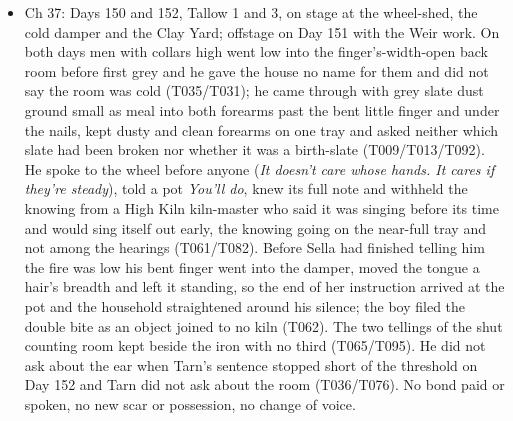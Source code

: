 \documentclass{design/chronicle}
\begin{document}
{\begin{itemize}[leftmargin=1.4em,itemsep=1pt,topsep=3pt,parsep=0pt]
\item Ch 37: Days 150 and 152, Tallow 1 and 3, on stage at the wheel-shed, the cold damper and the Clay Yard; offstage on Day 151 with the Weir work. On both days men with collars high went low into the finger’s-width-open back room before first grey and he gave the house no name for them and did not say the room was cold (T035/T031); he came through with grey slate dust ground small as meal into both forearms past the bent little finger and under the nails, kept dusty and clean forearms on one tray and asked neither which slate had been broken nor whether it was a birth-slate (T009/T013/T092). He spoke to the wheel before anyone (\emph{It doesn’t care whose hands. It cares if they’re steady}), told a pot \emph{You’ll do}, knew its full note and withheld the knowing from a High Kiln kiln-master who said it was singing before its time and would sing itself out early, the knowing going on the near-full tray and not among the hearings (T061/T082). Before Sella had finished telling him the fire was low his bent finger went into the damper, moved the tongue a hair’s breadth and left it standing, so the end of her instruction arrived at the pot and the household straightened around his silence; the boy filed the double bite as an object joined to no kiln (T062). The two tellings of the shut counting room kept beside the iron with no third (T065/T095). He did not ask about the ear when Tarn’s sentence stopped short of the threshold on Day 152 and Tarn did not ask about the room (T036/T076). No bond paid or spoken, no new scar or possession, no change of voice.

\end{itemize}

\begin{itemize}[leftmargin=1.4em,itemsep=1pt,topsep=3pt,parsep=0pt]


\end{itemize}}
\end{document}
